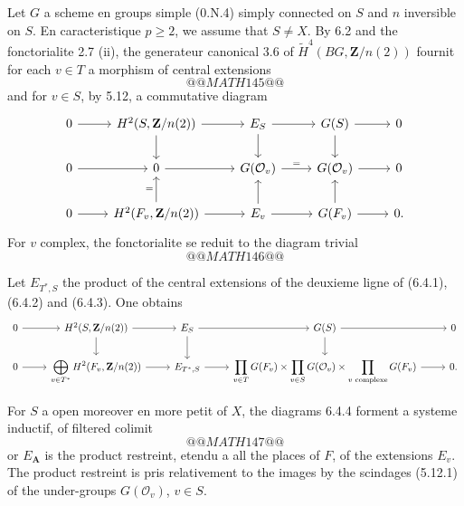 \documentclass[11pt,a4paper]{article}
\theoremstyle{plain}
\theoremstyle{definition}
\begin{document}
Let $G$ a scheme en groups simple (0.N.4) simply connected on $S$ and $n$ inversible on $S$. En caracteristique $p \geq 2$, we assume that $S \neq X$. By 6.2 and the fonctorialite 2.7 (ii), the generateur canonical 3.6 of $\widetilde{H}^4(BG, \mathbf{Z}/n(2))$ fournit for each $v \in T$ a morphism of central extensions
\[
@@MATH145@@
\]
and for $v \in S$, by 5.12, a commutative diagram
\begin{equation}\label{6.4.1}
\begin{tikzcd}
0 \arrow{r} & H^2(S, \mathbf{Z}/n(2)) \arrow{r} \arrow{d} & E_S \arrow{r} \arrow{d} & G(S) \arrow{r} \arrow{d} & 0 \\
0 \arrow{r} & 0 \arrow{r} & G(\mathcal{O}_v) \arrow{r}{=} & G(\mathcal{O}_v) \arrow{r} & 0 \\
0 \arrow{r} & H^2(F_v, \mathbf{Z}/n(2)) \arrow{r} \arrow{u}{=} & E_v \arrow{r} \arrow{u} & G(F_v) \arrow{r} \arrow{u} & 0.
\end{tikzcd}
\end{equation}
For $v$ complex, the fonctorialite se reduit to the diagram trivial
\[
@@MATH146@@
\]

Let $E_{T^*,S}$ the product of the central extensions of the deuxieme ligne of (6.4.1), (6.4.2) and (6.4.3). One obtains
\begin{equation}\label{6.4.4}
\begin{tikzcd}
0 \arrow{r} & H^2(S, \mathbf{Z}/n(2)) \arrow{r} \arrow{d} & E_S \arrow{r} \arrow{d} & G(S) \arrow{r} \arrow{d} & 0 \\
0 \arrow{r} & \displaystyle\bigoplus_{v \in T^*} H^2(F_v, \mathbf{Z}/n(2)) \arrow{r} & E_{T^*,S} \arrow{r} & \displaystyle\prod_{v \in T} G(F_v) \times \prod_{v \in S} G(\mathcal{O}_v) \times \prod_{v \text{ complexe}} G(F_v) \arrow{r} & 0.
\end{tikzcd}
\end{equation}

For $S$ a open moreover en more petit of $X$, the diagrams 6.4.4 forment a systeme inductif, of filtered colimit
\[
@@MATH147@@
\]
or $E_{\mathbf{A}}$ is the product restreint, etendu a all the places of $F$, of the extensions $E_v$. The product restreint is pris relativement to the images by the scindages (5.12.1) of the under-groups $G(\mathcal{O}_v)$, $v \in S$.
\end{document}
